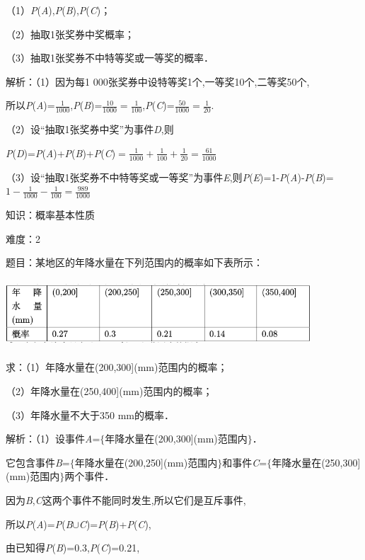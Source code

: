 \documentclass{article} %
\begin{document}
（1）\textit{P}(\textit{A}),\textit{P}(\textit{B}),\textit{P}(\textit{C})；

（2）抽取1张奖券中奖概率；

（3）抽取1张奖券不中特等奖或一等奖的概率．

解析：（1）因为每1 000张奖券中设特等奖1个,一等奖10个,二等奖50个,

所以\textit{P}(\textit{A})=$\frac{1}{1000}$,\textit{P}(\textit{B})=$\frac{10}{1000}=\frac{1}{100}$,\textit{P}(\textit{C})=$\frac{50}{1000}=\frac{1}{20}$.

（2）设``抽取1张奖券中奖''为事件\textit{D},则

\textit{P}(\textit{D})=\textit{P}(\textit{A})+\textit{P}(\textit{B})+\textit{P}(\textit{C})$=\frac{1}{1000}+\frac{1}{100}+\frac{1}{20}=\frac{61}{1000}$

（3）设``抽取1张奖券不中特等奖或一等奖''为事件\textit{E},则\textit{P}(\textit{E})=1-\textit{P}(\textit{A})-\textit{P}(\textit{B})=$1-\frac{1}{1000}-\frac{1}{100}=\frac{989}{1000}$

知识：概率基本性质

难度：2

题目：某地区的年降水量在下列范围内的概率如下表所示：

\includegraphics*[width=4.5in, height=1in, keepaspectratio=false]{image125}

求：（1）年降水量在(200,300](mm)范围内的概率；

（2）年降水量在(250,400](mm)范围内的概率；

（3）年降水量不大于350 mm的概率．

解析：（1）设事件\textit{A}=$\mathrm{\{}$年降水量在(200,300](mm)范围内$\mathrm{\}}$．

它包含事件\textit{B}=$\mathrm{\{}$年降水量在(200,250](mm)范围内$\mathrm{\}}$和事件\textit{C}=$\mathrm{\{}$年降水量在(250,300](mm)范围内$\mathrm{\}}$两个事件．

因为\textit{B},\textit{C}这两个事件不能同时发生,所以它们是互斥事件,

所以\textit{P}(\textit{A})=\textit{P}(\textit{B}$\mathrm{\cup}$\textit{C})=\textit{P}(\textit{B})+\textit{P}(\textit{C}),

由已知得\textit{P}(\textit{B})=0.3,\textit{P}(\textit{C})=0.21,
\end{document}

